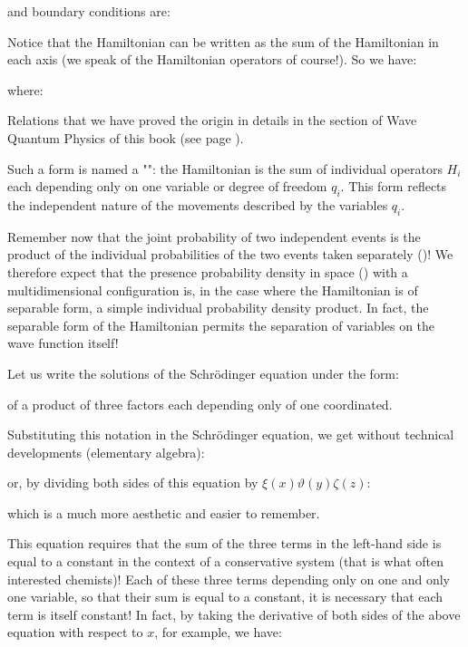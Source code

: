 	and boundary conditions are:
	
	Notice that the Hamiltonian can be written as the sum of the Hamiltonian in each axis (we speak of the Hamiltonian operators of course!). So we have:
	
	where:
	
	Relations that we have proved the origin in details in the section of Wave Quantum Physics of this book (see page \pageref{schrodinger wave equation}).
	
	Such a form is named a "": the Hamiltonian is the sum of individual operators $H_i$ each depending only on one variable or degree of freedom $q_i$. This form reflects the independent nature of the movements described by the variables $q_i$.
	
	Remember now that the joint probability of two independent events is the product of the individual probabilities of the two events taken separately ()! We therefore expect that the presence probability density in space () with a multidimensional configuration is, in the case where the Hamiltonian is of separable form, a simple individual probability density product. In fact, the separable form of the Hamiltonian permits the separation of variables on the wave function itself!

	Let us write the solutions of the Schrödinger equation under the form:
	
	of a product of three factors each depending only of one coordinated.

	Substituting this notation in the Schrödinger equation, we get without technical developments (elementary algebra):
	
	or, by dividing both sides of this equation by $\xi(x)\vartheta(y)\zeta(z)$:
	
	which is a much more aesthetic and easier to remember.
	
	This equation requires that the sum of the three terms in the left-hand side is equal to a constant in the context of a conservative system (that is what often interested chemists)! Each of these three terms depending only on one and only one variable, so that their sum is equal to a constant, it is necessary that each term is itself constant! In fact, by taking the derivative of both sides of the above equation with respect to $x$, for example, we have:
	
